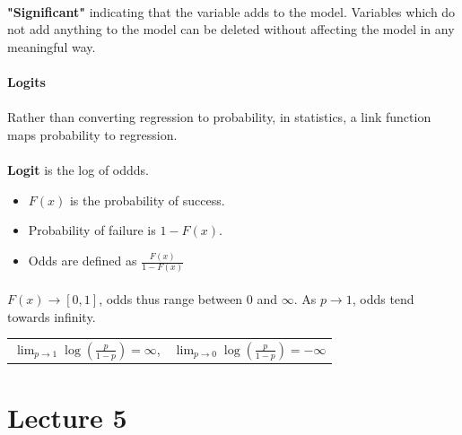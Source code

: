 \documentclass[letterpaper,12pt]{article}
\begin{document}
\paragraph{}\textbf{"Significant"} indicating that the variable adds to the model. Variables
which do not add anything to the model can be deleted without affecting the model in any meaningful
way.
\paragraph{Logits}
\paragraph{}Rather than converting regression to probability, in statistics, a link function maps
probability to regression.
\paragraph{} \textbf{Logit} is the log of oddds.
\begin{itemize}
    \item $F(x)$ is the probability of success.
    \item Probability of failure is $1-F(x)$.
    \item Odds are defined as $\frac{F(x)}{1-F(x)}$
\end{itemize}

\paragraph{}$F(x) \to [0,1]$, odds thus range between 0 and $\infty$. As $p \to 1$, odds tend
towards infinity.
\begin{table}[htpb]
    \centering
    \begin{tabular}{l r}
    $\displaystyle\lim_{p \to 1}\log(\frac{p}{1-p}) = \infty$, &      
    $\displaystyle\lim_{p \to 0}\log(\frac{p}{1-p}) = -\infty$ 
    \end{tabular}
\end{table}
\section*{Lecture 5}
\end{document}
